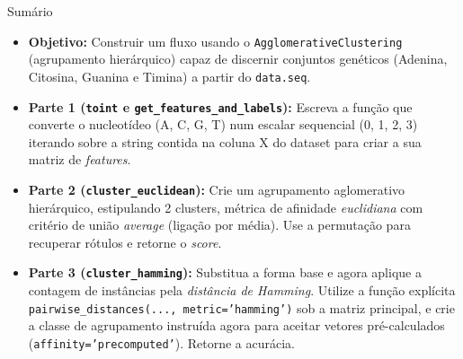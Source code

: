 \documentclass[11pt,a4paper]{article}
\begin{document}
\begin{exercicio}{Sumário}
\begin{itemize}
    \item \textbf{Objetivo:} Construir um fluxo usando o \texttt{AgglomerativeClustering} (agrupamento hierárquico) capaz de discernir conjuntos genéticos (Adenina, Citosina, Guanina e Timina) a partir do \texttt{data.seq}.
    \item \textbf{Parte 1 (\texttt{toint} e \texttt{get\_features\_and\_labels}):} Escreva a função que converte o nucleotídeo (A, C, G, T) num escalar sequencial (0, 1, 2, 3) iterando sobre a string contida na coluna X do dataset para criar a sua matriz de \textit{features}.
    \item \textbf{Parte 2 (\texttt{cluster\_euclidean}):} Crie um agrupamento aglomerativo hierárquico, estipulando 2 clusters, métrica de afinidade \textit{euclidiana} com critério de união \emph{average} (ligação por média). Use a permutação para recuperar rótulos e retorne o \emph{score}.
    \item \textbf{Parte 3 (\texttt{cluster\_hamming}):} Substitua a forma base e agora aplique a contagem de instâncias pela \textit{distância de Hamming}. Utilize a função explícita \texttt{pairwise\_distances(..., metric='hamming')} sob a matriz principal, e crie a classe de agrupamento instruída agora para aceitar vetores pré-calculados (\texttt{affinity='precomputed'}). Retorne a acurácia.
\end{itemize}
\end{exercicio}
\end{document}
